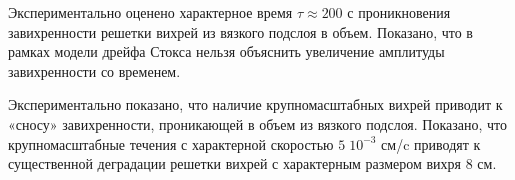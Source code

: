 
Экспериментально оценено характерное время $\tau \approx 200$ с проникновения завихренности решетки вихрей из вязкого подслоя в объем. Показано, что в рамках модели дрейфа Стокса нельзя объяснить увеличение амплитуды завихренности со временем.

Экспериментально показано, что наличие крупномасштабных вихрей приводит к «сносу» завихренности, проникающей в объем из вязкого подслоя. Показано, что крупномасштабные течения с характерной скоростью $5 \; 10^{-3}$ см/c приводят к существенной деградации решетки вихрей с характерным размером вихря 8 см.